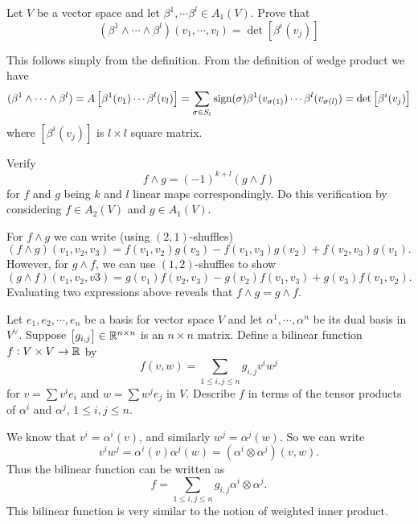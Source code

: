 \begin{problem}
	\label{problem:1-covectorAndDeterminant}
	Let $ V $ be a vector space and let $ \beta^1,\cdots \beta^l \in A_1(V) $. Prove that 
	\[ (\beta^1 \wedge \cdots \wedge \beta^l)(v_1,\cdots,v_l) = \det\left[ \beta^i(v_j) \right]  \]
\end{problem}
\begin{solution}
	This follows simply from the definition. From the definition of wedge product we have
	\[ (\beta^1 \wedge \cdots \wedge \beta^l) = A \left[\beta^1(v_1)\cdots \beta^l(v_l)\right] = \sum_{\sigma \in S_l} \operatorname{sign}(\sigma) \beta^1(v_{\sigma(1)}) \cdots \beta^l(v_{\sigma(l)}) = \det\left[ \beta^i(v_j) \right] \]
	where $ \left[ \beta^i(v_j) \right] $ is $ l\times l $ square matrix.
\end{solution}

\begin{problem}
	Verify 
	\[ f \wedge g = (-1)^{k+l}(g\wedge f) \]
	for $ f $ and $ g $ being $ k $ and $ l $ linear maps correspondingly. Do this verification by considering $ f\in A_2(V) $ and $ g \in A_1(V) $.
\end{problem}

\begin{solution}
	For $ f\wedge g $ we can write (using $ (2,1) $-shuffles)
	\[(f\wedge g)(v_1,v_2,v_3) = f(v_1,v_2)g(v_3) - f(v_1,v_3)g(v_2) + f(v_2,v_3)g(v_1).\]
	However, for $ g\wedge f $, we can use $ (1,2) $-shuffles to show
	\[ (g\wedge f)(v_1,v_2,v3) = g(v_1)f(v_2,v_3) - g(v_2)f(v_1,v_3) + g(v_3)f(v_1,v_2).  \]
	Evaluating two expressions above reveals that $ f\wedge g = g \wedge f. $
\end{solution}

\begin{problem}
	Let $ e_1,e_2,\cdots,e_n $ be a basis for vector space $ V $ and let $ \alpha^1,\cdots,\alpha^n $ be its dual basis in $ V^\vee $. Suppose $ \left[g_{i,j}\right] \in \mathbb{R}^{n\times n} $ is an $ n\times n $ matrix. Define a bilinear function $ f: V\times V \to \mathbb{R} $ by
	\[ f(v,w) = \sum_{1 \leq i,j \leq n} g_{i,j}v^i w^j \]
	for $ v = \sum v^i e_i $ and $ w = \sum w^j e_j $ in $ V $. Describe $ f $ in terms of the tensor products of $ \alpha^i $ and $ \alpha^j $, $ 1 \leq i, j \leq n $.
\end{problem}
\begin{solution}
	We know that $ v^i = \alpha^i (v) $, and similarly $ w^j = \alpha^j (w) $. So we can write
	\[ v^i w^j = \alpha^i(v) \alpha^j (w) = (\alpha^i \otimes \alpha^j)(v,w). \]
	Thus the bilinear function can be written as
	\[ f = \sum_{1\leq i,j \leq n} g_{i,j} \alpha^i \otimes \alpha^j. \]
	This bilinear function is very similar to the notion of weighted inner product.
\end{solution}

